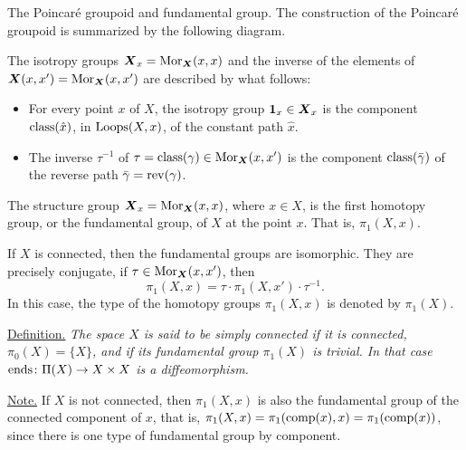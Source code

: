 \begin{Article}{The Poincar\'e groupoid and fundamental group.}{}
  The construction of the Poincar{\'e} groupoid is
  summarized by the following diagram.
  \begin{center}
  \end{center}
  The isotropy groups ${\boldsymbol{X}}_x = {\operatorname{Mor}}_{\boldsymbol{X}}(x,x)$ and the inverse of the elements of ${\boldsymbol{X}}(x,x') = {\operatorname{Mor}}_{\boldsymbol{X}}(x,x')$ are described by what follows:
  \begin{itemize}
    \item[a)] For every point $x$ of $X$,
    the isotropy group ${\mathbf{1}}_x \in {\boldsymbol{X}}_x$ is the component $\operatorname{class}(\hat x)$,
    in $\operatorname{Loops}(X,x)$,
    of the constant path $\hat x$.
    \item[b)] The inverse $\tau^{-1}$ of $\tau = \operatorname{class}(\gamma) \in {\operatorname{Mor}}_{\boldsymbol{X}}(x,x')$ is the component $\operatorname{class}(\bar \gamma)$ of the reverse path $\bar \gamma = \operatorname{rev}(\gamma)$.
  \end{itemize}
  The structure group ${\boldsymbol{X}}_x = {\operatorname{Mor}}_{\boldsymbol{X}}(x,x)$,
  where $x \in X$,
  is the first homotopy group,
  or the fundamental group,
  of $X$ at the point $x$.
  That is,
  $\pi_1(X,x)$.

  If $X$ is connected,
  then the fundamental groups
  are isomorphic.
  They are precisely conjugate,
  if $\tau \in {\operatorname{Mor}}_{\boldsymbol{X}}(x,x')$,
  then
  $$%
  \pi_1(X,x) = \tau \cdot \pi_1(X,x') \cdot \tau^{-1}.
  $$%
  In this case,
  the type of the homotopy groups $\pi_1(X,x)$ is denoted by $\pi_1(X)$.

  \uline{Definition.} {\itshape The space $X$ is said to be {\em simply connected} if it is connected,
  $\pi_0(X) = \{X\}$,
  and if its fundamental group $\pi_1(X)$ is trivial.
  In that case $\operatorname{ends} \colon \Pi(X) \to X \times X$ is a diffeomorphism.}

  \uline{Note.} If $X$ is not connected, then $\pi_1(X,x)$ is also the fundamental group of the connected component of $x$,
  that is,
  $\pi_1(X,x) = \pi_1(\operatorname{comp}(x),x) = \pi_1(\operatorname{comp}(x))$,
  since there is one type of fundamental group by component.
\end{Article} %

